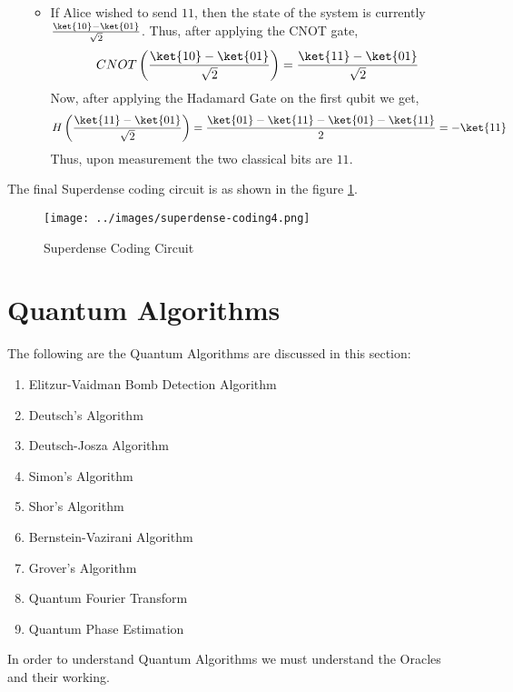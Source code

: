 \documentclass[12pt, oneside]{book}
\theoremstyle{definition}
\theoremstyle{definition}
\theoremstyle{remark}
\begin{document}
\begin{enumerate}
\begin{itemize}
\[        \]
        \item If Alice wished to send $11$, then the state of the system is currently $\frac{\ket{10}-\ket{01}}{\sqrt{2}}$. Thus, after applying the CNOT gate,
        \[
            CNOT\left(\frac{\ket{10}-\ket{01}}{\sqrt{2}}\right)=\frac{\ket{11}-\ket{01}}{\sqrt{2}}
        \]
        Now, after applying the Hadamard Gate on the first qubit we get,
        \[
            H\left(\frac{\ket{11}-\ket{01}}{\sqrt{2}}\right)=\frac{\ket{01}-\ket{11}-\ket{01}-\ket{11}}{2}=-\ket{11}
        \]
        Thus, upon measurement the two classical bits are $11$.
    \end{itemize}
\end{enumerate}

The final Superdense coding circuit is as shown in the figure \ref{fig:superdense-coding}.
\begin{figure}[H]
    \centering
    \texttt{[image: ../images/superdense-coding4.png]}
    \caption{Superdense Coding Circuit}
    \label{fig:superdense-coding}
\end{figure}
 
\newpage

\section{Quantum Algorithms}
The following are the Quantum Algorithms are discussed in this section:
\begin{enumerate}
    \item Elitzur-Vaidman Bomb Detection Algorithm
    \item Deutsch's Algorithm
    \item Deutsch-Josza Algorithm
    \item Simon's Algorithm
    \item Shor's Algorithm
    \item Bernstein-Vazirani Algorithm
    \item Grover's Algorithm
    \item Quantum Fourier Transform
    \item Quantum Phase Estimation
\end{enumerate}
In order to understand Quantum Algorithms we must understand the Oracles and their working.
\end{document}
